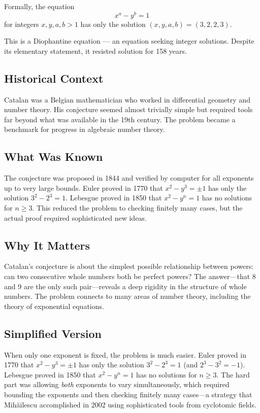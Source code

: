 Formally, the equation
\begin{equation}
x^a - y^b = 1
\end{equation}
for integers $x, y, a, b > 1$ has only the solution $(x, y, a, b) = (3, 2, 2, 3)$.

This is a Diophantine equation --- an equation seeking integer solutions. Despite its elementary statement, it resisted solution for 158 years.

\subsection{Historical Context}
Catalan was a Belgian mathematician who worked in differential geometry and number theory. His conjecture seemed almost trivially simple but required tools far beyond what was available in the 19th century. The problem became a benchmark for progress in algebraic number theory.

\subsection{What Was Known}
The conjecture was proposed in 1844 and verified by computer for all exponents up to very large bounds. Euler proved in 1770 that $x^2 - y^3 = \pm 1$ has only the solution $3^2 - 2^3 = 1$. Lebesgue proved in 1850 that $x^2 - y^n = 1$ has no solutions for $n \ge 3$. This reduced the problem to checking finitely many cases, but the actual proof required sophisticated new ideas.

\subsection{Why It Matters}
Catalan's conjecture is about the simplest possible relationship between powers: can two consecutive whole numbers both be perfect powers? The answer---that 8 and 9 are the only such pair---reveals a deep rigidity in the structure of whole numbers. The problem connects to many areas of number theory, including the theory of exponential equations.

\subsection{Simplified Version}
When only one exponent is fixed, the problem is much easier. Euler proved in 1770 that $x^2 - y^3 = \pm 1$ has only the solution $3^2 - 2^3 = 1$ (and $2^3 - 3^2 = -1$). Lebesgue proved in 1850 that $x^2 - y^n = 1$ has no solutions for $n \ge 3$. The hard part was allowing \emph{both} exponents to vary simultaneously, which required bounding the exponents and then checking finitely many cases---a strategy that Mihăilescu accomplished in 2002 using sophisticated tools from cyclotomic fields.

